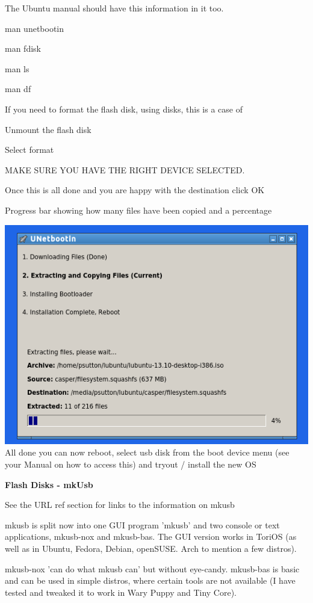 \documentclass[12pt,a4paper]{book}
\begin{document}
The Ubuntu manual should have this information in it too.

man unetbootin

man fdisk

man ls

man df

If you need to format the flash disk, using disks, this is a case of

Unmount the flash disk

Select format

MAKE SURE YOU HAVE THE RIGHT DEVICE SELECTED.

Once this is all done and you are happy with the destination click OK

Progress bar showing how many files have been copied and a percentage


\includegraphics[width=0.7\linewidth]{unetbootin5} \\

All done you can now reboot, select usb disk from the boot device menu (see your Manual on how to access this) and tryout /  install the new OS


\textbf{Flash Disks - mkUsb}

See the URL ref section for links to the information on mkusb \cite{mkUSB-Quick-Start-manual}

mkusb is split now into one GUI program 'mkusb' and two console or text
applications, mkusb-nox and mkusb-bas. The GUI version works in ToriOS
(as well as in Ubuntu, Fedora, Debian, openSUSE. Arch to mention a few
distros).

mkusb-nox 'can do what mkusb can' but without eye-candy. mkusb-bas is
basic and can be used in simple distros, where certain tools are not
available (I have tested and tweaked it to work in Wary Puppy and Tiny
Core).
\end{document}
